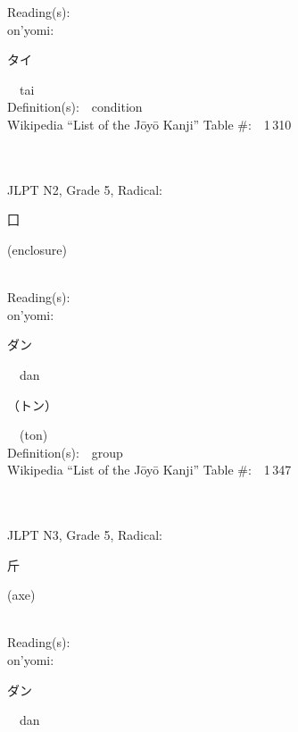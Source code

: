 \begin{multicols}{2}
Reading(s):\ \ \\
{\hspace*{1em}}on'yomi:\ \ \\
{\hspace*{2em}}{\begin{CJK}{UTF8}{min} タイ \end{CJK}}\ \ tai\ \ \\
Definition(s):\ \ condition \\
Wikipedia ``List of the J\=oy\=o Kanji'' Table \#:\ \ 1\,310 \\
\ \ \\
{\fontsize{34pt}{40pt}  }\ \ \\  %
{JLPT N2, Grade 5, Radical:\ \ {\begin{CJK}{UTF8}{min} 囗 \end{CJK}} (enclosure) } \\
Reading(s):\ \ \\
{\hspace*{1em}}on'yomi:\ \ \\
{\hspace*{2em}}{\begin{CJK}{UTF8}{min} ダン \end{CJK}}\ \ dan\ \ \\
{\hspace*{2em}}{\begin{CJK}{UTF8}{min} （トン） \end{CJK}}\ \ (ton)\ \ \\
Definition(s):\ \ group \\
Wikipedia ``List of the J\=oy\=o Kanji'' Table \#:\ \ 1\,347 \\
\ \ \\
{\fontsize{34pt}{40pt}  }\ \ \\  %
{JLPT N3, Grade 5, Radical:\ \ {\begin{CJK}{UTF8}{min} 斤 \end{CJK}} (axe) } \\
Reading(s):\ \ \\
{\hspace*{1em}}on'yomi:\ \ \\
{\hspace*{2em}}{\begin{CJK}{UTF8}{min} ダン \end{CJK}}\ \ dan\ \ \\

\end{multicols}
